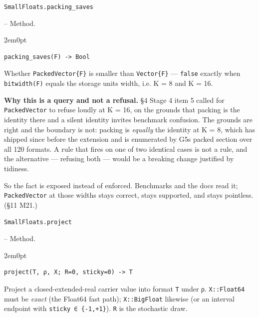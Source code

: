 \par\medskip\noindent\begin{minipage}{\linewidth}
\hypertarget{17503642904345592057}{\texttt{SmallFloats.packing\_\allowbreak{}saves}}  -- {Method.}
\nopagebreak
\begin{adjustwidth}{2em}{0pt}


\begin{verbatim}
packing_saves(F) -> Bool
\end{verbatim}

Whether \texttt{PackedVector\{F\}} is smaller than \texttt{Vector\{F\}} — \texttt{false} exactly when \texttt{bitwidth(F)} equals the storage unit{\textquotesingle}s width, i.e. K = 8 and K = 16.

\textbf{Why this is a query and not a refusal.} §4 Stage 4 item 5 called for \texttt{PackedVector} to refuse loudly at K = 16, on the grounds that packing is the identity there and a silent identity invites benchmark confusion. The grounds are right and the boundary is not: packing is \emph{equally} the identity at K = 8, which has shipped since before the extension and is enumerated by G5{\textquotesingle}s packed section over all 120 formats. A rule that fires on one of two identical cases is not a rule, and the alternative — refusing both — would be a breaking change justified by tidiness.

So the fact is exposed instead of enforced. Benchmarks and the docs read it; \texttt{PackedVector} at those widths stays correct, stays supported, and stays pointless. (§11 M21.)



\end{adjustwidth}
\end{minipage}
\par\medskip

\par\medskip\noindent\begin{minipage}{\linewidth}
\hypertarget{1763536505995871807}{\texttt{SmallFloats.project}}  -- {Method.}
\nopagebreak
\begin{adjustwidth}{2em}{0pt}


\begin{verbatim}
project(T, ρ, X; R=0, sticky=0) -> T
\end{verbatim}

Project a closed-extended-real carrier value into format \texttt{T} under ρ. \texttt{X::Float64} must be \emph{exact} (the Float64 fast path); \texttt{X::BigFloat} likewise (or an interval endpoint with \texttt{sticky ∈ \{-1,+1\}}). \texttt{R} is the stochastic draw.



\end{adjustwidth}
\end{minipage}
\par\medskip

